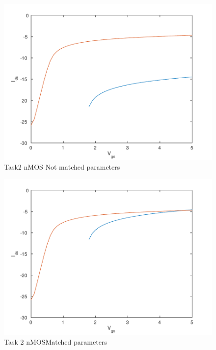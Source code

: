 \documentclass[11pt,a4paper]{report}
\begin{document}
\begin{figure}[ht!]
\caption{Task2 nMOS Not matched parameters}
\centering
\includegraphics[scale=1]{task2-nomatch-log-eps-converted-to.pdf}
\end{figure}
\begin{figure}[ht!]
\caption{Task 2 nMOSMatched parameters}
\centering
\includegraphics[scale=1]{task2-match-log-eps-converted-to.pdf}
\end{figure}
\end{document}

